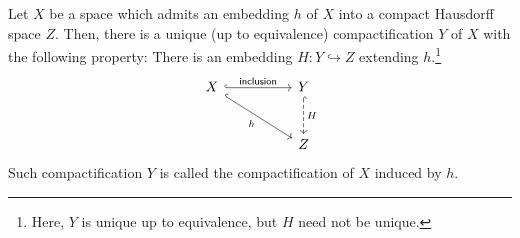 \begin{thm}\label{emb&cptf}
    Let $X$ be a space which admits an embedding $h$ of $X$ into a compact Hausdorff space $Z$.
    Then, there is a unique (up to equivalence) compactification $Y$ of $X$ with the following property:
    There is an embedding $H: Y\hookrightarrow Z$ extending $h$.\footnote{Here, $Y$ is unique up to equivalence, but $H$ need not be unique.}
    \begin{equation*}
        \begin{tikzcd}[row sep=large, column sep=huge]
            X \arrow[dr, "h"', hook] \arrow[r, "\textsf{inclusion}", hook] & Y \arrow[d, "H", hook, dashed] \\
            &Z
        \end{tikzcd}
    \end{equation*}
    Such compactification $Y$ is called the compactification of $X$ induced by $h$.
\end{thm}
